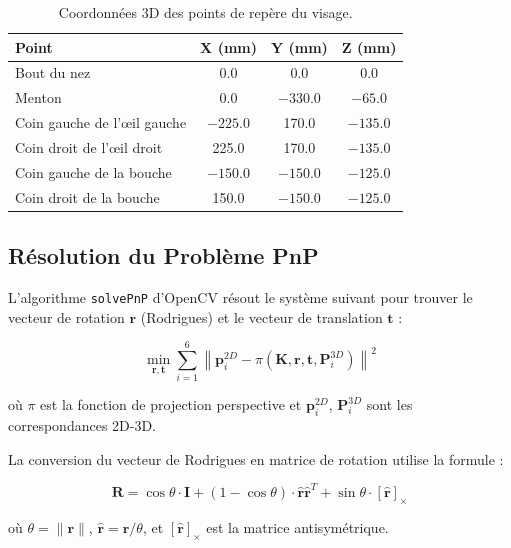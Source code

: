 \documentclass[12pt,a4paper,twoside]{report}
\begin{document}
\begin{table}[H]
\centering
\caption{Coordonnées 3D des points de repère du visage.}
\label{tab:3d_landmarks}
\renewcommand{\arraystretch}{1.3}
\begin{tabular}{|l|c|c|c|}
\hline
\rowcolor{stellantisblue!15}
\textbf{Point} & \textbf{X (mm)} & \textbf{Y (mm)} & \textbf{Z (mm)} \\
\hline
Bout du nez & 0.0 & 0.0 & 0.0 \\
\hline
Menton & 0.0 & $-330.0$ & $-65.0$ \\
\hline
Coin gauche de l'œil gauche & $-225.0$ & 170.0 & $-135.0$ \\
\hline
Coin droit de l'œil droit & 225.0 & 170.0 & $-135.0$ \\
\hline
Coin gauche de la bouche & $-150.0$ & $-150.0$ & $-125.0$ \\
\hline
Coin droit de la bouche & 150.0 & $-150.0$ & $-125.0$ \\
\hline
\end{tabular}
\end{table}

\subsection{Résolution du Problème PnP}

L'algorithme \texttt{solvePnP} d'OpenCV résout le système suivant pour trouver le vecteur de rotation $\mathbf{r}$ (Rodrigues) et le vecteur de translation $\mathbf{t}$ :

\begin{equation}
\min_{\mathbf{r}, \mathbf{t}} \sum_{i=1}^{6} \left\| \mathbf{p}_i^{2D} - \pi(\mathbf{K}, \mathbf{r}, \mathbf{t}, \mathbf{P}_i^{3D}) \right\|^2
\label{eq:pnp_optimization}
\end{equation}

où $\pi$ est la fonction de projection perspective et $\mathbf{p}_i^{2D}$, $\mathbf{P}_i^{3D}$ sont les correspondances 2D-3D.

La conversion du vecteur de Rodrigues en matrice de rotation utilise la formule :

\begin{equation}
\mathbf{R} = \cos\theta \cdot \mathbf{I} + (1 - \cos\theta) \cdot \hat{\mathbf{r}} \hat{\mathbf{r}}^T + \sin\theta \cdot [\hat{\mathbf{r}}]_\times
\label{eq:rodrigues}
\end{equation}

où $\theta = \|\mathbf{r}\|$, $\hat{\mathbf{r}} = \mathbf{r}/\theta$, et $[\hat{\mathbf{r}}]_\times$ est la matrice antisymétrique.
\end{document}
